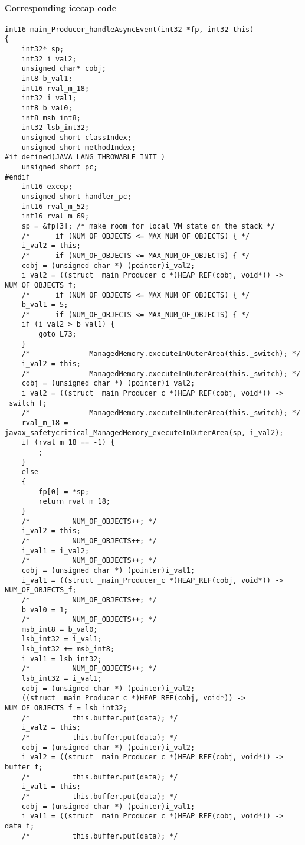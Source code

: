 \paragraph{Corresponding icecap code}\hfill
\begin{lstlisting}[firstnumber=56910]
int16 main_Producer_handleAsyncEvent(int32 *fp, int32 this)
{
	int32* sp;
	int32 i_val2;
	unsigned char* cobj;
	int8 b_val1;
	int16 rval_m_18;
	int32 i_val1;
	int8 b_val0;
	int8 msb_int8;
	int32 lsb_int32;
	unsigned short classIndex;
	unsigned short methodIndex;
#if defined(JAVA_LANG_THROWABLE_INIT_)
	unsigned short pc;
#endif
	int16 excep;
	unsigned short handler_pc;
	int16 rval_m_52;
	int16 rval_m_69;
	sp = &fp[3]; /* make room for local VM state on the stack */
	/*		if (NUM_OF_OBJECTS <= MAX_NUM_OF_OBJECTS) { */
	i_val2 = this;
	/*		if (NUM_OF_OBJECTS <= MAX_NUM_OF_OBJECTS) { */
	cobj = (unsigned char *) (pointer)i_val2;
	i_val2 = ((struct _main_Producer_c *)HEAP_REF(cobj, void*)) -> NUM_OF_OBJECTS_f;
	/*		if (NUM_OF_OBJECTS <= MAX_NUM_OF_OBJECTS) { */
	b_val1 = 5;
	/*		if (NUM_OF_OBJECTS <= MAX_NUM_OF_OBJECTS) { */
	if (i_val2 > b_val1) {
		goto L73;
	}
	/*				ManagedMemory.executeInOuterArea(this._switch); */
	i_val2 = this;
	/*				ManagedMemory.executeInOuterArea(this._switch); */
	cobj = (unsigned char *) (pointer)i_val2;
	i_val2 = ((struct _main_Producer_c *)HEAP_REF(cobj, void*)) -> _switch_f;
	/*				ManagedMemory.executeInOuterArea(this._switch); */
	rval_m_18 = javax_safetycritical_ManagedMemory_executeInOuterArea(sp, i_val2);
	if (rval_m_18 == -1) {
		;
	}
	else
	{
		fp[0] = *sp;
		return rval_m_18;
	}
	/*			NUM_OF_OBJECTS++; */
	i_val2 = this;
	/*			NUM_OF_OBJECTS++; */
	i_val1 = i_val2;
	/*			NUM_OF_OBJECTS++; */
	cobj = (unsigned char *) (pointer)i_val1;
	i_val1 = ((struct _main_Producer_c *)HEAP_REF(cobj, void*)) -> NUM_OF_OBJECTS_f;
	/*			NUM_OF_OBJECTS++; */
	b_val0 = 1;
	/*			NUM_OF_OBJECTS++; */
	msb_int8 = b_val0;
	lsb_int32 = i_val1;
	lsb_int32 += msb_int8;
	i_val1 = lsb_int32;
	/*			NUM_OF_OBJECTS++; */
	lsb_int32 = i_val1;
	cobj = (unsigned char *) (pointer)i_val2;
	((struct _main_Producer_c *)HEAP_REF(cobj, void*)) -> NUM_OF_OBJECTS_f = lsb_int32;
	/*			this.buffer.put(data); */
	i_val2 = this;
	/*			this.buffer.put(data); */
	cobj = (unsigned char *) (pointer)i_val2;
	i_val2 = ((struct _main_Producer_c *)HEAP_REF(cobj, void*)) -> buffer_f;
	/*			this.buffer.put(data); */
	i_val1 = this;
	/*			this.buffer.put(data); */
	cobj = (unsigned char *) (pointer)i_val1;
	i_val1 = ((struct _main_Producer_c *)HEAP_REF(cobj, void*)) -> data_f;
	/*			this.buffer.put(data); */

\end{lstlisting}
